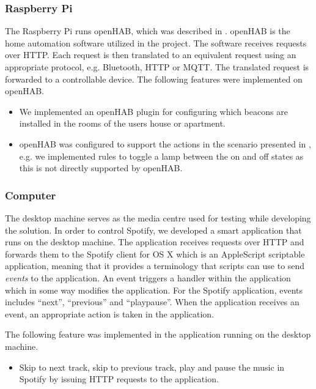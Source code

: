 \subsubsection{Raspberry Pi}

The Raspberry Pi runs openHAB, which was described in . openHAB is the home automation software utilized in the project. The software receives requests over HTTP. Each request is then translated to an equivalent request using an appropriate protocol, e.g. Bluetooth, HTTP or MQTT. The translated request is forwarded to a controllable device. The following features were implemented on openHAB.

\begin{itemize}
\item We implemented an openHAB plugin for configuring which beacons are installed in the rooms of the users house or apartment.
\item openHAB was configured to support the actions in the scenario presented in , e.g. we implemented rules to toggle a lamp between the on and off states as this is not directly supported by openHAB.
\end{itemize}

\subsubsection{Computer}

The desktop machine serves as the media centre used for testing while developing the solution. In order to control Spotify, we developed a smart application that runs on the desktop machine. The application receives requests over HTTP and forwards them to the Spotify client for OS X which is an AppleScript scriptable application, meaning that it provides a terminology that scripts can use to send \emph{events} to the application. An event triggers a handler within the application which in some way modifies the application. For the Spotify application, events includes ``next'', ``previous'' and ``playpause''. When the application receives an event, an appropriate action is taken in the application.

The following feature was implemented in the application running on the desktop machine.

\begin{itemize}
\item Skip to next track, skip to previous track, play and pause the music in Spotify by issuing HTTP requests to the application.
\end{itemize}

